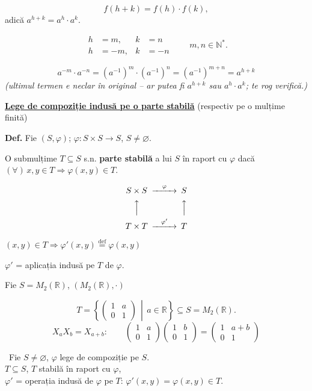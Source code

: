 \[
f(h+k) = f(h)\cdot f(k),
\]
adică $a^{h+k} = a^h \cdot a^k$.

\[
\begin{aligned}
h&=m, & k&=n\\
h&=-m, & k&=-n
\end{aligned}
\qquad m,n\in\mathbb{N}^*.
\]

\[
a^{-m}\cdot a^{-n} = (a^{-1})^{m}\cdot(a^{-1})^{n} = (a^{-1})^{m+n} = a^{h+k}
\]
\noindent\textit{(ultimul termen e neclar în original -- ar putea fi $a^{h+k}$ sau $a^h\cdot a^k$; te rog verifică.)}

\bigskip
\noindent\underline{\textbf{Lege de compoziție indusă pe o parte stabilă}} (respectiv pe o mulțime finită)

\bigskip
\noindent\textbf{Def.} Fie $(S,\varphi)$; $\varphi : S\times S \to S$, $S \neq \varnothing$.

\noindent O submulțime $T \subseteq S$ s.n. \textbf{parte stabilă} a lui $S$ în raport cu $\varphi$ dacă $(\forall)\, x,y \in T \Rightarrow \varphi(x,y) \in T$.

\[
\begin{CD}
S\times S @>\varphi>> S\\
@AAA @AAA\\
T\times T @>\varphi'>> T
\end{CD}
\]

\noindent $(x,y)\in T \Rightarrow \varphi'(x,y) \overset{\text{def}}{=} \varphi(x,y)$

\noindent $\varphi'$ = aplicația indusă pe $T$ de $\varphi$.

\noindent Fie $S = M_2(\mathbb{R})$, $(M_2(\mathbb{R}),\cdot)$

\[
T = \left\{ \begin{pmatrix} 1 & a \\ 0 & 1 \end{pmatrix} \,\middle|\, a\in\mathbb{R} \right\} \subseteq S = M_2(\mathbb{R}).
\]
\[
X_a X_b = X_{a+b}: \qquad \begin{pmatrix}1 & a\\ 0 & 1\end{pmatrix}\begin{pmatrix}1 & b\\ 0 & 1\end{pmatrix} = \begin{pmatrix}1 & a+b\\ 0 & 1\end{pmatrix}
\]

\bigskip
\noindent{} \ Fie $S\neq\varnothing$, $\varphi$ lege de compoziție pe $S$.\\
$T\subseteq S$, $T$ stabilă în raport cu $\varphi$,\\
$\varphi'$ = operația indusă de $\varphi$ pe $T$: $\varphi'(x,y)=\varphi(x,y)\in T$.

